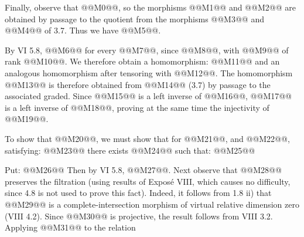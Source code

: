 Finally, observe that @@M0@@, so the morphisms @@M1@@ and @@M2@@ are obtained by passage to the quotient from the morphisms @@M3@@ and @@M4@@ of 3.7. Thus we have @@M5@@.

By VI 5.8, @@M6@@ for every @@M7@@, since @@M8@@, with @@M9@@ of rank @@M10@@. We therefore obtain a homomorphism:
@@M11@@
and an analogous homomorphism after tensoring with @@M12@@. The homomorphism @@M13@@ is therefore obtained from @@M14@@ (3.7) by passage to the associated graded. Since @@M15@@ is a left inverse of @@M16@@, @@M17@@ is a left inverse of @@M18@@, proving at the same time the injectivity of @@M19@@.

To show that @@M20@@, we must show that for @@M21@@, and @@M22@@, satisfying:
@@M23@@
there exists @@M24@@ such that:
@@M25@@

Put:
@@M26@@
Then by VI 5.8, @@M27@@. Next observe that @@M28@@ preserves the filtration (using results of Exposé VIII, which causes no difficulty, since 4.8 is not used to prove this fact). Indeed, it follows from 1.8 ii) that @@M29@@ is a complete-intersection morphism of virtual relative dimension zero (VIII 4.2). Since @@M30@@ is projective, the result follows from VIII 3.2. Applying @@M31@@ to the relation
